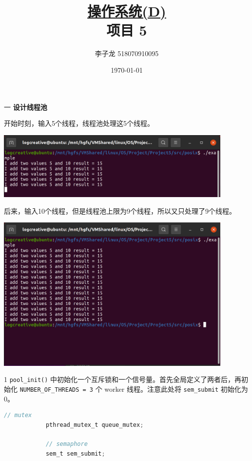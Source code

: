 \documentclass[12pt,a4paper]{article}
\newenvironment{problems}{\begin{list}{}{\renewcommand{\makelabel}[1]{\textbf{##1}\hfil}}}{\end{list}}
\newenvironment{steps}{\begin{list}{}{\renewcommand{\makelabel}[1]{##1.\hfil}}}{\end{list}}
\begin{document}
\title{\normalsize \underline{操作系统(D)}\\\LARGE 项目 5}
\author{李子龙 518070910095}
\date{\today}
\maketitle

\begin{problems}
    \item[一] \textbf{设计线程池}

    开始时刻，输入5个线程，线程池处理这5个线程。

    \includegraphics[width=0.88\textwidth]{threadpool1.png}

    后来，输入10个线程，但是线程池上限为9个线程，所以又只处理了9个线程。
    
    \includegraphics[width=0.88\textwidth]{threadpool2.png}

    \begin{steps}
        \item[1] \verb"pool_init()" 中初始化一个互斥锁和一个信号量。首先全局定义了两者后，再初始化 \verb"NUMBER_OF_THREADS = 3" 个 worker 线程。注意此处将 \verb"sem_submit" 初始化为 0。
        \begin{lstlisting}[language=c]
            // mutex
            pthread_mutex_t queue_mutex;

            // semaphore
            sem_t sem_submit;


\end{lstlisting}
\end{steps}
\end{problems}
\end{document}
